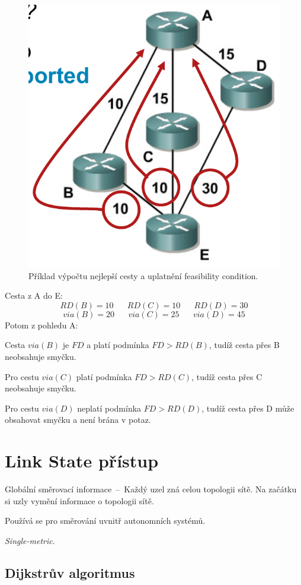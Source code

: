\begin{figure}[H]
    \centering
    \includegraphics[width=0.4\linewidth]{feasibility_condition.pdf}
    \caption{Příklad výpočtu nejlepší cesty a uplatnění feasibility condition.}
\end{figure}

\noindent Cesta z A do E:
$$
RD(B) = 10 \;\;\;\;\;\;
RD(C) = 10 \;\;\;\;\;\;
RD(D) = 30
$$
$$
via(B) = 20 \;\;\;\;\;\;
via(C) = 25 \;\;\;\;\;\;
via(D) = 45
$$
Potom z pohledu A: \begin{compactitem}
    \item Cesta $via(B)$ je $FD$ a platí podmínka $FD > RD(B)$, tudíž cesta přes B neobsahuje smyčku.
    \item Pro cestu $via(C)$ platí podmínka $FD > RD(C)$, tudíž cesta přes C neobsahuje smyčku.
    \item Pro cestu $via(D)$ neplatí podmínka $FD > RD(D)$, tudíž cesta přes D může obsahovat smyčku a není brána v potaz.
\end{compactitem}


\section{Link State přístup}

\begin{compactitem}
    \item Globální směrovací informace~--~Každý uzel zná celou topologii sítě. Na začátku si uzly vymění informace o topologii sítě.
    \item Používá se pro směrování uvnitř autonomních systémů.
    \item \textit{Single-metric}.
\end{compactitem}

\subsection{Dijkstrův algoritmus}

